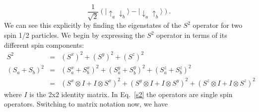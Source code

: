 \begin{equation}
  \frac{1}{\sqrt{2}}\left( \lvert \uparrow_a \downarrow_b \rangle - \lvert \downarrow_a \uparrow_b \rangle \right).
   \label{singlet}
\end{equation}
We can see this explicitly by finding the eigenstates of the $S^2$ operator for 
two spin 1/2 particles.  We begin by expressing the $S^2$ operator in terms of its different
spin components:
\begin{eqnarray}
S^2 &=& (S^x)^2 + (S^y)^2 + (S^z)^2 \\
(S_a + S_b)^2 &=& (S^x_a+S^x_b)^2 + (S^y_a+S^y_b)^2 + (S^z_a+S^z_b)^2 \nonumber \\
			&=&(S^x\otimes I+I \otimes S^x)^2 + 
			(S^y\otimes I+I\otimes S^y)^2 + (S^z\otimes I+I\otimes S^z)^2
			\label{s2}
\end{eqnarray}
where $I$ is the 2x2 identity matrix.  In Eq.~\eqref{s2} the operators are single spin operators.
Switching to matrix notation now, we have
